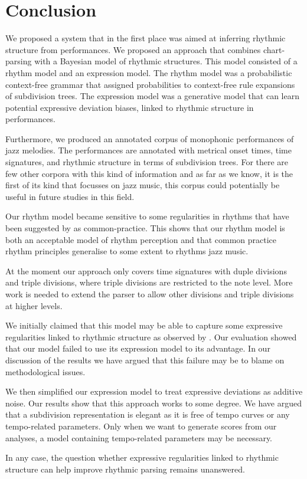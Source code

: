 \chapter{Conclusion}
\label{sec:conclusion}


We proposed a system that in the first place was aimed at inferring rhythmic structure from performances. We proposed an approach that combines chart-parsing with a Bayesian model of rhythmic structures. This model consisted of a rhythm model and an expression model. The rhythm model was a probabilistic context-free grammar that assigned probabilities to context-free rule expansions of subdivision trees. The expression model was a generative model that can learn potential expressive deviation biases, linked to rhythmic structure in performances.

Furthermore, we produced an annotated corpus of monophonic performances of jazz melodies. The performances are annotated with metrical onset times, time signatures, and rhythmic structure in terms of subdivision trees. For there are few other corpora with this kind of information and as far as we know, it is the first of its kind that focusses on jazz music, this corpus could potentially be useful in future studies in this field. 

Our rhythm model became sensitive to some regularities in rhythms that have been suggested by \citet{temperley2010modeling} as common-practice. This shows that our rhythm model is both an acceptable model of rhythm perception and that common practice rhythm principles generalise to some extent to rhythms jazz music.

At the moment our approach only covers time signatures with duple divisions and triple divisions, where triple divisions are restricted to the note level. More work is needed to extend the parser to allow other divisions and triple divisions at higher levels.

We initially claimed that this model may be able to capture some expressive regularities linked to rhythmic structure as observed by \citet{bengtsson1983analysis}. Our evaluation showed that our model failed to use its expression model to its advantage. In our discussion of the results we have argued that this failure may be to blame on methodological issues.

We then simplified our expression model to treat expressive deviations as additive noise. Our results show that this approach works to some degree. We have argued that a subdivision representation is elegant as it is free of tempo curves or any tempo-related parameters. Only when we want to generate scores from our analyses, a model containing tempo-related parameters may be necessary.

In any case, the question whether expressive regularities linked to rhythmic structure can help improve rhythmic parsing remains unanswered. 
